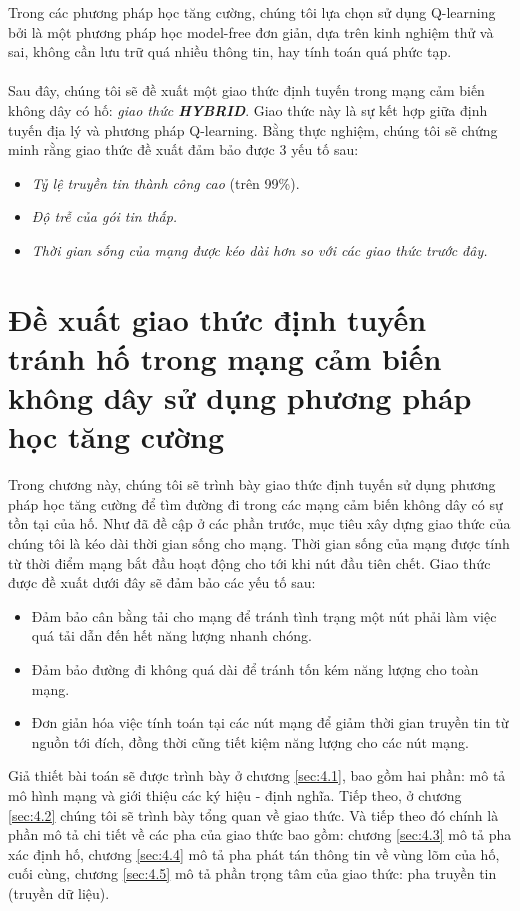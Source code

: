 \documentclass[12pt]{report}
\begin{document}
Trong các phương pháp học tăng cường, chúng tôi lựa chọn sử dụng Q-learning bởi là một phương pháp học model-free đơn giản, dựa trên kinh nghiệm thử và sai, không cần lưu trữ quá nhiều thông tin, hay tính toán quá phức tạp.\\ \\
Sau đây, chúng tôi sẽ đề xuất một giao thức định tuyến trong mạng cảm biến không dây có hố: \textit{giao thức \textbf{HYBRID}}. Giao thức này là sự kết hợp giữa định tuyến địa lý và phương pháp Q-learning. Bằng thực nghiệm, chúng tôi sẽ chứng minh rằng giao thức đề xuất đảm bảo được 3 yếu tố sau: 
\begin{itemize}
\item \textit{Tỷ lệ truyền tin thành công cao} (trên 99\%).
\item \textit{Độ trễ của gói tin thấp.} 
\item \textit{Thời gian sống của mạng được kéo dài hơn so với các giao thức trước đây.}
\end{itemize}
\chapter{Đề xuất giao thức định tuyến tránh hố trong mạng cảm biến không dây sử dụng phương pháp học tăng cường}
\label{sec:4}
Trong chương này, chúng tôi sẽ trình bày giao thức định tuyến sử dụng phương pháp học tăng cường để tìm đường đi trong các mạng cảm biến không dây có sự tồn tại của hố. Như đã đề cập ở các phần trước, mục tiêu xây dựng giao thức của chúng tôi là kéo dài thời gian sống cho mạng. Thời gian sống của mạng được tính từ thời điểm mạng bắt đầu hoạt động cho tới khi nút đầu tiên chết. Giao thức được đề xuất dưới đây sẽ đảm bảo các yếu tố sau:
\begin{itemize}
\item Đảm bảo cân bằng tải cho mạng để tránh tình trạng một nút phải làm việc quá tải dẫn đến hết năng lượng nhanh chóng.
\item Đảm bảo đường đi không quá dài để tránh tốn kém năng lượng cho toàn mạng.
\item Đơn giản hóa việc tính toán tại các nút mạng để giảm thời gian truyền tin từ nguồn tới đích, đồng thời cũng tiết kiệm năng lượng cho các nút mạng.
\end{itemize}
Giả thiết bài toán sẽ được trình bày ở chương \ref{sec:4.1}, bao gồm hai phần: mô tả mô hình mạng và giới thiệu các ký hiệu - định nghĩa. Tiếp theo, ở chương \ref{sec:4.2} chúng tôi sẽ trình bày tổng quan về giao thức. Và tiếp theo đó chính là phần mô tả chi tiết về các pha của giao thức bao gồm: chương \ref{sec:4.3} mô tả pha xác định hố, chương \ref{sec:4.4} mô tả pha phát tán thông tin về vùng lõm của hố, cuối cùng, chương \ref{sec:4.5} mô tả phần trọng tâm của giao thức: pha truyền tin (truyền dữ liệu).
 
\end{document}
